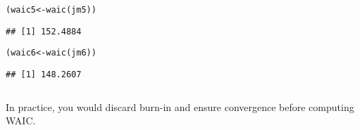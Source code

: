 \documentclass[color=usenames,dvipsnames]{beamer}\usepackage[]{graphicx}\usepackage[]{xcolor}
\makeatletter
\newcommand{\hlstd}[1]{\textcolor[rgb]{0,0,0}{#1}}%
\newcommand{\hlkwb}[1]{\textcolor[rgb]{0,0.341,0.682}{#1}}%
\newcommand{\hlkwd}[1]{\textcolor[rgb]{0.004,0.004,0.506}{#1}}%
\newenvironment{kframe}{%
 \def\at@end@of@kframe{}%
 \ifinner\ifhmode%
  \def\at@end@of@kframe{\end{minipage}}%
  \begin{minipage}{\columnwidth}%
 \fi\fi%
 \def\FrameCommand##1{\hskip\@totalleftmargin \hskip-\fboxsep
 \colorbox{shadecolor}{##1}\hskip-\fboxsep
     \hskip-\linewidth \hskip-\@totalleftmargin \hskip\columnwidth}%
 \MakeFramed {\advance\hsize-\width
   \@totalleftmargin\z@ \linewidth\hsize
   \@setminipage}}%
 {\par\unskip\endMakeFramed%
 \at@end@of@kframe}
\newenvironment{knitrout}{}{} %
\makeatother
\begin{document}
\begin{frame}[fragile]
\begin{columns}
\begin{column}{0.5\textwidth}
\begin{knitrout}
\end{knitrout}
\begin{knitrout}\scriptsize
{}\color{fgcolor}\begin{kframe}
\begin{alltt}
\hlstd{(waic5} \hlkwb{<-} \hlkwd{waic}\hlstd{(jm5))}
\end{alltt}
\begin{verbatim}
## [1] 152.4884
\end{verbatim}
\end{kframe}
\end{knitrout}
\begin{knitrout}\scriptsize
{}\color{fgcolor}\begin{kframe}
\begin{alltt}
\hlstd{(waic6} \hlkwb{<-} \hlkwd{waic}\hlstd{(jm6))}
\end{alltt}
\begin{verbatim}
## [1] 148.2607
\end{verbatim}
\end{kframe}
\end{knitrout}
    \end{column}
  \end{columns}
  \pause
  \vfill
  In practice, you would discard burn-in and ensure convergence before
  computing WAIC.
\end{frame}
\end{document}
